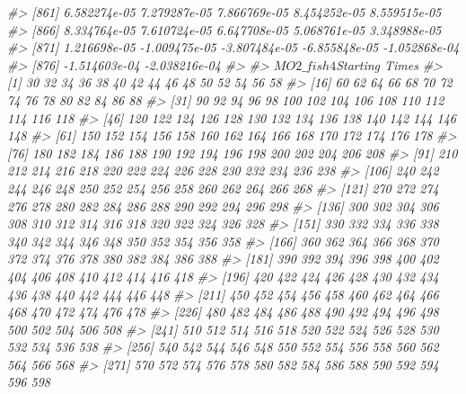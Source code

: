 \documentclass[
]{article}
\newenvironment{Shaded}{\begin{snugshade}}{\end{snugshade}}
\newcommand{\CommentTok}[1]{\textcolor[rgb]{0.56,0.35,0.01}{\textit{#1}}}
\begin{document}
\begin{Shaded}
\begin{Highlighting}[]
\CommentTok{\#\textgreater{} [861]  6.582274e{-}05  7.279287e{-}05  7.866769e{-}05  8.454252e{-}05  8.559515e{-}05}
\CommentTok{\#\textgreater{} [866]  8.334764e{-}05  7.610724e{-}05  6.647708e{-}05  5.068761e{-}05  3.348988e{-}05}
\CommentTok{\#\textgreater{} [871]  1.216698e{-}05 {-}1.009475e{-}05 {-}3.807484e{-}05 {-}6.855848e{-}05 {-}1.052868e{-}04}
\CommentTok{\#\textgreater{} [876] {-}1.514603e{-}04 {-}2.038216e{-}04}
\CommentTok{\#\textgreater{} }
\CommentTok{\#\textgreater{} $MO2\_fish4$\textasciigrave{}Starting Times\textasciigrave{}}
\CommentTok{\#\textgreater{}   [1]   30   32   34   36   38   40   42   44   46   48   50   52   54   56   58}
\CommentTok{\#\textgreater{}  [16]   60   62   64   66   68   70   72   74   76   78   80   82   84   86   88}
\CommentTok{\#\textgreater{}  [31]   90   92   94   96   98  100  102  104  106  108  110  112  114  116  118}
\CommentTok{\#\textgreater{}  [46]  120  122  124  126  128  130  132  134  136  138  140  142  144  146  148}
\CommentTok{\#\textgreater{}  [61]  150  152  154  156  158  160  162  164  166  168  170  172  174  176  178}
\CommentTok{\#\textgreater{}  [76]  180  182  184  186  188  190  192  194  196  198  200  202  204  206  208}
\CommentTok{\#\textgreater{}  [91]  210  212  214  216  218  220  222  224  226  228  230  232  234  236  238}
\CommentTok{\#\textgreater{} [106]  240  242  244  246  248  250  252  254  256  258  260  262  264  266  268}
\CommentTok{\#\textgreater{} [121]  270  272  274  276  278  280  282  284  286  288  290  292  294  296  298}
\CommentTok{\#\textgreater{} [136]  300  302  304  306  308  310  312  314  316  318  320  322  324  326  328}
\CommentTok{\#\textgreater{} [151]  330  332  334  336  338  340  342  344  346  348  350  352  354  356  358}
\CommentTok{\#\textgreater{} [166]  360  362  364  366  368  370  372  374  376  378  380  382  384  386  388}
\CommentTok{\#\textgreater{} [181]  390  392  394  396  398  400  402  404  406  408  410  412  414  416  418}
\CommentTok{\#\textgreater{} [196]  420  422  424  426  428  430  432  434  436  438  440  442  444  446  448}
\CommentTok{\#\textgreater{} [211]  450  452  454  456  458  460  462  464  466  468  470  472  474  476  478}
\CommentTok{\#\textgreater{} [226]  480  482  484  486  488  490  492  494  496  498  500  502  504  506  508}
\CommentTok{\#\textgreater{} [241]  510  512  514  516  518  520  522  524  526  528  530  532  534  536  538}
\CommentTok{\#\textgreater{} [256]  540  542  544  546  548  550  552  554  556  558  560  562  564  566  568}
\CommentTok{\#\textgreater{} [271]  570  572  574  576  578  580  582  584  586  588  590  592  594  596  598}

\end{Highlighting}
\end{Shaded}
\end{document}
